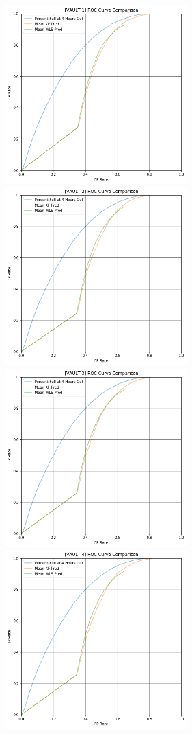\begin{figure}[h]
\centering
\includegraphics[width=7cm]{body/results/Graphs/JustSeries/1.PerformaceofMean/3.Compare/Raw/v1.png}
\includegraphics[width=7cm]{body/results/Graphs/JustSeries/1.PerformaceofMean/3.Compare/Raw/v2.png}
\includegraphics[width=7cm]{body/results/Graphs/JustSeries/1.PerformaceofMean/3.Compare/Raw/v3.png}
\includegraphics[width=7cm]{body/results/Graphs/JustSeries/1.PerformaceofMean/3.Compare/Raw/v4.png}

\end{figure}
